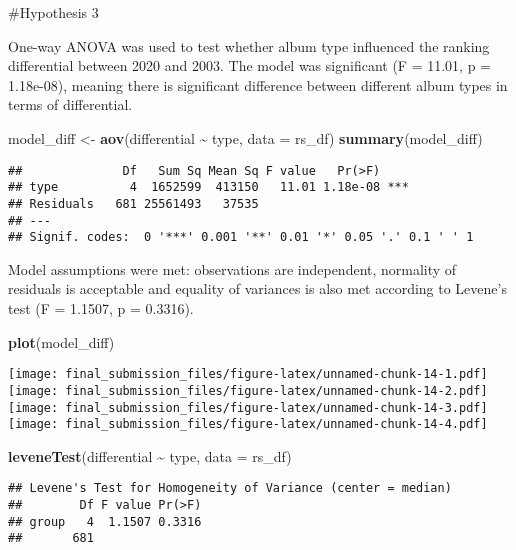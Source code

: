 \documentclass[
]{article}
\newenvironment{Shaded}{\begin{snugshade}}{\end{snugshade}}
\newcommand{\AttributeTok}[1]{\textcolor[rgb]{0.13,0.29,0.53}{#1}}
\newcommand{\FunctionTok}[1]{\textcolor[rgb]{0.13,0.29,0.53}{\textbf{#1}}}
\newcommand{\NormalTok}[1]{#1}
\newcommand{\OtherTok}[1]{\textcolor[rgb]{0.56,0.35,0.01}{#1}}
\newcommand{\SpecialCharTok}[1]{\textcolor[rgb]{0.81,0.36,0.00}{\textbf{#1}}}
\begin{document}
\#Hypothesis 3

One-way ANOVA was used to test whether album type influenced the ranking
differential between 2020 and 2003. The model was significant (F =
11.01, p = 1.18e-08), meaning there is significant difference between
different album types in terms of differential.

\begin{Shaded}
\begin{Highlighting}[]
\NormalTok{model\_diff }\OtherTok{\textless{}{-}} \FunctionTok{aov}\NormalTok{(differential }\SpecialCharTok{\textasciitilde{}}\NormalTok{ type, }\AttributeTok{data =}\NormalTok{ rs\_df)}
\FunctionTok{summary}\NormalTok{(model\_diff)}
\end{Highlighting}
\end{Shaded}

\begin{verbatim}
##              Df   Sum Sq Mean Sq F value   Pr(>F)    
## type          4  1652599  413150   11.01 1.18e-08 ***
## Residuals   681 25561493   37535                     
## ---
## Signif. codes:  0 '***' 0.001 '**' 0.01 '*' 0.05 '.' 0.1 ' ' 1
\end{verbatim}

Model assumptions were met: observations are independent, normality of
residuals is acceptable and equality of variances is also met according
to Levene's test (F = 1.1507, p = 0.3316).

\begin{Shaded}
\begin{Highlighting}[]
\FunctionTok{plot}\NormalTok{(model\_diff)}
\end{Highlighting}
\end{Shaded}

\texttt{[image: final\_submission\_files/figure-latex/unnamed-chunk-14-1.pdf]}
\texttt{[image: final\_submission\_files/figure-latex/unnamed-chunk-14-2.pdf]}
\texttt{[image: final\_submission\_files/figure-latex/unnamed-chunk-14-3.pdf]}
\texttt{[image: final\_submission\_files/figure-latex/unnamed-chunk-14-4.pdf]}

\begin{Shaded}
\begin{Highlighting}[]
\FunctionTok{leveneTest}\NormalTok{(differential }\SpecialCharTok{\textasciitilde{}}\NormalTok{ type, }\AttributeTok{data =}\NormalTok{ rs\_df)}
\end{Highlighting}
\end{Shaded}

\begin{verbatim}
## Levene's Test for Homogeneity of Variance (center = median)
##        Df F value Pr(>F)
## group   4  1.1507 0.3316
##       681
\end{verbatim}
\end{document}
